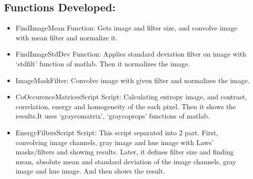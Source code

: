 \documentclass{article}
\begin{document}
\subsection{Functions Developed:}

	\begin{itemize}
		\item FindImageMean Function: Gets image and filter size, and convolve image with mean filter and normalize it.
		\item FindImageStdDev Function: Applies standard deviation filter on image with ‘stdfilt’ function of matlab. Then it normalizes the image.
		\item ImageMaskFilter: Convolve image with given filter and normalizes the image.
		\item CoOccurenceMatricesScript Script: Calculating entropy image, and contrast, correlation, energy and homogeneity of the each pixel. Then it shows the results.It uses ‘graycomatrix’, ‘graycoprops’ functions of matlab.
		\item EnergyFiltersScript Script: This script separated into 2 part. First, convolving image channels, gray image and hue image with Laws’ masks/filters and showing results. Later, it defines filter size and finding mean, absolute mean and standard deviation of the image channels, gray image and hue image. And then shows the result.
		
	\end{itemize}
		
\end{document}
